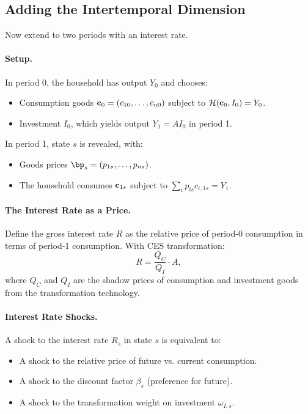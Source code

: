 \subsection{Adding the Intertemporal Dimension}
\label{subsec:ac-iso-intertemporal}

Now extend to two periods with an interest rate.

\paragraph{Setup.}
In period 0, the household has output $Y_0$ and chooses:
\begin{itemize}[nosep]
\item Consumption goods $\mathbf{c}_0 = (c_{10}, \ldots, c_{n0})$ subject to $\mathcal{H}(\mathbf{c}_0, I_0) = Y_0$.
\item Investment $I_0$, which yields output $Y_1 = A I_0$ in period 1.
\end{itemize}

In period 1, state $s$ is revealed, with:
\begin{itemize}[nosep]
\item Goods prices $\bp_s = (p_{1s}, \ldots, p_{ns})$.
\item The household consumes $\mathbf{c}_{1s}$ subject to $\sum_i p_{is} c_{i,1s} = Y_1$.
\end{itemize}

\paragraph{The Interest Rate as a Price.}
Define the gross interest rate $R$ as the relative price of period-0 consumption in terms of period-1 consumption. With CES transformation:
\begin{equation}
R = \frac{Q_C}{Q_I} \cdot A,
\label{eq:ac-iso-interest}
\end{equation}
where $Q_C$ and $Q_I$ are the shadow prices of consumption and investment goods from the transformation technology.

\paragraph{Interest Rate Shocks.}
A shock to the interest rate $R_s$ in state $s$ is equivalent to:
\begin{itemize}[nosep]
\item A shock to the relative price of future vs. current consumption.
\item A shock to the discount factor $\beta_s$ (preference for future).
\item A shock to the transformation weight on investment $\omega_{I,s}$.
\end{itemize}


